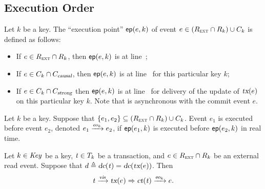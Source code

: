 
\subsection{Execution Order} \label{ss:eo}

\begin{appdefinition} \label{def:ep}
  Let $k$ be a key.
  The ``execution point'' ${\sf ep}(e, k)$ of event
  $e \in (R_{\textsc{ext}} \cap R_{k}) \cup C_{k}$ is defined as follows:

  \begin{itemize}
    \item If $e \in R_{\textsc{ext}} \cap R_{k}$,
      then ${\sf ep}(e, k)$ is at
      line~\code{\ref{alg:unistore-replica}}{\ref{line:readkey-read}};
    \item If $e \in C_{k} \cap C_{\textsl{causal}}$,
      then ${\sf ep}(e, k)$ is at
      line~\code{\ref{alg:unistore-replica}}{\ref{line:commit-oplog}}
      for this particular key $k$;
    \item If $e \in C_{k} \cap C_{\textsl{strong}}$
      then ${\sf ep}(e, k)$ is at
      line~\code{\ref{alg:unistore-strong-commit}}{\ref{line:deliverupdates-oplog}}
      for delivery of the update of $\textsl{tx}(e)$ on this particular key $k$.
      Note that \deliver{} is asynchronous with the commit event $e$.
  \end{itemize}
\end{appdefinition}

\begin{appdefinition} \label{def:perkey-eo}
  Let $k$ be a key.
  Suppose that $\{e_{1}, e_{2}\} \subseteq (R_{\textsc{ext}} \cap R_{k}) \cup C_{k}$.
  Event $e_1$ is executed before event $e_2$, denoted $e_1 \xrightarrow{\textsl{eo}_{k}} e_2$,
  if ${\sf ep}(e_{1}, k)$ is executed before ${\sf ep}(e_{2}, k)$ in real time.
\end{appdefinition}

\begin{applemma} \label{lemma:vis-perkey-eo}
  Let $k \in \mathit{Key}$ be a key, $\mathit{t} \in T_{k}$ be a transaction,
  and $e \in R_{\textsc{ext}} \cap R_{k}$ be an external read event.
  Suppose that $d \triangleq \textsl{dc}(\mathit{t}) = \textsl{dc}(\textsl{tx}(e))$.
  Then
  \[
    \tvar \rel{\vis} \txfunc(e) \implies \commitoftx(\tvar) \rel{\eok} e.
  \]
\end{applemma}


